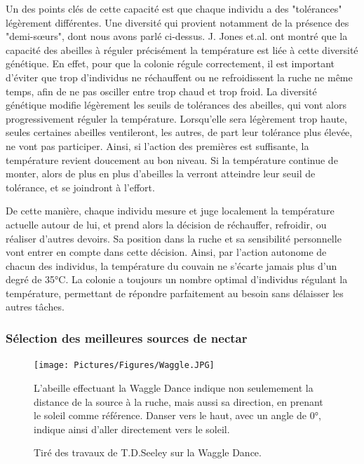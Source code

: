 			Un des points clés de cette capacité est que chaque individu a des "tolérances" légèrement différentes. Une diversité qui provient notamment de la présence des "demi-sœurs", dont nous avons parlé ci-dessus. J. Jones et.al. \cite{jones_honey_2004} ont montré que la capacité des abeilles à réguler précisément la température est liée à cette diversité génétique. En effet, pour que la colonie régule correctement, il est important d'éviter que trop d'individus ne réchauffent ou ne refroidissent la ruche ne même temps, afin de ne pas osciller entre trop chaud et trop froid. La diversité génétique modifie légèrement les seuils de tolérances des abeilles, qui vont alors progressivement réguler la température. Lorsqu'elle sera légèrement trop haute, seules certaines abeilles ventileront, les autres, de part leur tolérance plus élevée, ne vont pas participer. Ainsi, si l'action des premières est suffisante, la température revient doucement au bon niveau. Si la température continue de monter, alors de plus en plus d'abeilles la verront atteindre leur seuil de tolérance, et se joindront à l'effort.
			
			De cette manière, chaque individu mesure et juge localement la température actuelle autour de lui, et prend alors la décision de réchauffer, refroidir, ou réaliser d'autres devoirs. Sa position dans la ruche et sa sensibilité personnelle vont entrer en compte dans cette décision. Ainsi, par l'action autonome de chacun des individus, la température du couvain ne s'écarte jamais plus d'un degré de 35°C. La colonie a toujours un nombre optimal d'individus régulant la température, permettant de répondre parfaitement au besoin sans délaisser les autres tâches.
			
			\subsubsection{Sélection des meilleures sources de nectar}
			
			\begin{figure}
			\centering
			\texttt{[image: Pictures/Figures/Waggle.JPG]}
				\caption{Tiré des travaux de T.D.Seeley \cite{seeley_wisdom_1995} sur la Waggle Dance.}{ L'abeille effectuant la Waggle Dance indique non seulemement la distance de la source à la ruche, mais aussi sa direction, en prenant le soleil comme référence. Danser vers le haut, avec un angle de 0°, indique ainsi d'aller directement vers le soleil.}
			\label{Waggle}
			\end{figure}
			
